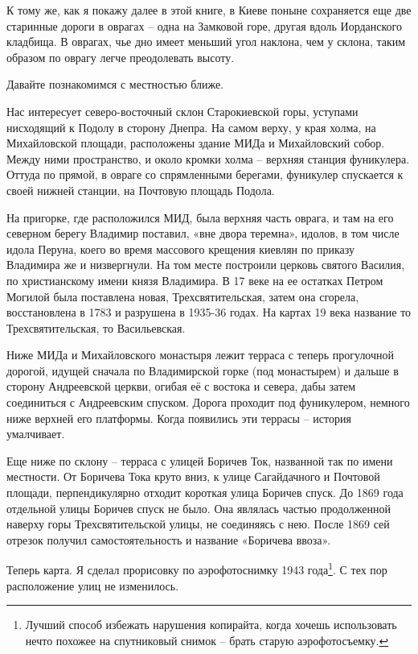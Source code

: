 К тому же, как я покажу далее в этой книге, в Киеве поныне сохраняется еще две старинные дороги в оврагах – одна на Замковой горе, другая вдоль Иорданского кладбища. В оврагах, чье дно имеет меньший угол наклона, чем у склона, таким образом по оврагу легче преодолевать высоту.

Давайте познакомимся с местностью ближе.

Нас интересует северо-восточный склон Старокиевской горы, уступами нисходящий к Подолу в сторону Днепра. На самом верху, у края холма, на Михайловской площади, расположены здание МИДа и Михайловский собор. Между ними пространство, и около кромки холма – верхняя станция фуникулера. Оттуда по прямой, в овраге со спрямленными берегами, фуникулер спускается к своей нижней станции, на Почтовую площадь Подола.

На пригорке, где расположился МИД, была верхняя часть оврага, и там на его северном берегу Владимир поставил, «вне двора теремна», идолов, в том числе идола Перуна, коего во время массового крещения киевлян по приказу Владимира же и низвергнули. На том месте построили церковь святого Василия, по христианскому имени князя Владимира. В 17 веке на ее остатках Петром Могилой была поставлена новая, Трехсвятительская, затем она сгорела, восстановлена в 1783 и разрушена в 1935-36 годах. На картах 19 века название то Трехсвятительская, то Васильевская.

Ниже МИДа и Михайловского монастыря лежит терраса с теперь прогулочной дорогой, идущей сначала по Владимирской горке (под монастырем) и дальше в сторону Андреевской церкви, огибая её с востока и севера, дабы затем соединиться с Андреевским спуском. Дорога проходит под фуникулером, немного ниже верхней его платформы. Когда появились эти террасы – история умалчивает.

Еще ниже по склону – терраса с улицей Боричев Ток, названной так по имени местности. От Боричева Тока круто вниз, к улице Сагайдачного и Почтовой площади, перпендикулярно отходит короткая улица Боричев спуск. До 1869 года отдельной улицы Боричев спуск не было. Она являлась частью продолженной наверху горы Трехсвятительской улицы, не соединяясь с нею. После 1869 сей отрезок получил самостоятельность и название «Боричева ввоза».

Теперь карта. Я сделал прорисовку по аэрофотоснимку 1943 года\footnote{Лучший способ избежать нарушения копирайта, когда хочешь использовать нечто похожее на спутниковый снимок – брать старую аэрофотосъемку.}. С тех пор расположение улиц не изменилось.

